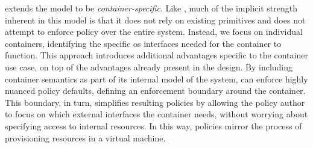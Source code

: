 \bpfcontain{} extends the \bpfbox{} model to be \textit{container-specific}. Like
\bpfbox{}, much of the implicit strength inherent in this model is that it does not rely
on existing primitives and does not attempt to enforce policy over the entire system.
Instead, we focus on individual containers, identifying the specific \gls{os} interfaces
needed for the container to function.  This approach introduces additional advantages
specific to the container use case, on top of the advantages already present in the
\bpfbox{} design. By including container semantics as part of its internal model of the
system, \bpfcontain{} can enforce highly nuanced policy defaults, defining an enforcement
boundary around the container. This boundary, in turn, simplifies resulting policies by
allowing the policy author to focus on which external interfaces the container needs,
without worrying about specifying access to internal resources. In this way, \bpfcontain{}
policies mirror the process of provisioning resources in a virtual machine.


